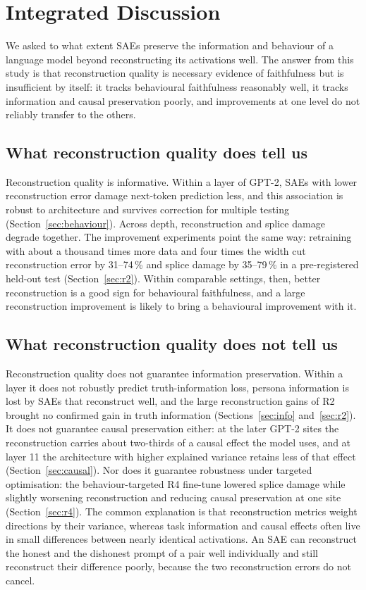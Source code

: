\section{Integrated Discussion}\label{sec:discussion}

We asked to what extent SAEs preserve the information and behaviour of a language model beyond reconstructing its
activations well. The answer from this study is that reconstruction quality is necessary evidence of faithfulness but
is insufficient by itself: it tracks behavioural faithfulness reasonably well, it tracks information and causal
preservation poorly, and improvements at one level do not reliably transfer to the others.

\subsection{What reconstruction quality does tell us}\label{sec:disc-does}

Reconstruction quality is informative. Within a layer of GPT-2, SAEs with lower reconstruction error damage next-token
prediction less, and this association is robust to architecture and survives correction for multiple testing
(Section~\ref{sec:behaviour}). Across depth, reconstruction and splice damage degrade together. The improvement
experiments point the same way: retraining with about a thousand times more data and four times the width cut
reconstruction error by 31--74\,\% and splice damage by 35--79\,\% in a pre-registered held-out test
(Section~\ref{sec:r2}). Within comparable settings, then, better reconstruction is a good sign for behavioural
faithfulness, and a large reconstruction improvement is likely to bring a behavioural improvement with it.

\subsection{What reconstruction quality does not tell us}\label{sec:disc-doesnot}

Reconstruction quality does not guarantee information preservation. Within a layer it does not robustly predict
truth-information loss, persona information is lost by SAEs that reconstruct well, and the large reconstruction gains
of R2 brought no confirmed gain in truth information (Sections~\ref{sec:info} and~\ref{sec:r2}). It does not
guarantee causal preservation either: at the later GPT-2 sites the reconstruction carries about two-thirds of a causal
effect the model uses, and at layer 11 the architecture with higher explained variance retains less of that effect
(Section~\ref{sec:causal}). Nor does it guarantee robustness under targeted optimisation: the behaviour-targeted R4
fine-tune lowered splice damage while slightly worsening reconstruction and reducing causal preservation at one site
(Section~\ref{sec:r4}). The common explanation is that reconstruction metrics weight directions by their variance,
whereas task information and causal effects often live in small differences between nearly identical activations. An
SAE can reconstruct the honest and the dishonest prompt of a pair well individually and still reconstruct their
difference poorly, because the two reconstruction errors do not cancel.

